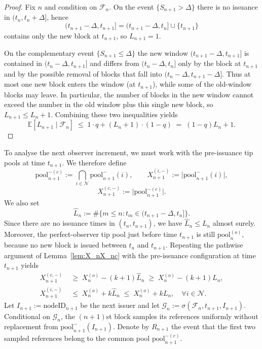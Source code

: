 \documentclass[a4paper,12pt,oneside,reqno]{amsart}
\newcommand{\Nodes}{{\mathcal N}}
\newcommand{\nodeID}{\mathrm{nodeID}}
\newcommand{\E}{{\mathbb E}}
\newcommand{\F}{{\mathcal F}}
\newcommand{\1}{{\mathbf 1}}
\newcommand{\pool}{\mathrm{pool}}
\begin{document}
\begin{proof}
Fix $n$ and condition on $\F_n$. On the event $\{S_{n+1}>\Delta\}$ there is no issuance in $(t_n,t_n+\Delta]$, hence
\[
   (t_{n+1}-\Delta,t_{n+1}] = (t_{n+1}-\Delta,t_n] \cup \{t_{n+1}\}
\]
contains only the new block at $t_{n+1}$, so $L_{n+1}=1$.

On the complementary event $\{S_{n+1}\le\Delta\}$ the new window $(t_{n+1}-\Delta,t_{n+1}]$ is contained in $(t_n-\Delta,t_{n+1}]$ and differs from $(t_n-\Delta,t_n]$ only by the block at $t_{n+1}$ and by the possible removal of blocks that fall into $(t_n-\Delta,t_{n+1}-\Delta]$. Thus at most one new block enters the window (at $t_{n+1}$), while some of the old-window blocks may leave. In particular,
the number of blocks in the new window cannot exceed the number in the old window plus this single new block, so $L_{n+1}\le L_n+1$. Combining these two inequalities yields
\[
   \E[L_{n+1}\mid\F_n]
   \;\le\; 1\cdot q + (L_n+1)\cdot(1-q)
   \;=\; (1-q)L_n + 1.
\]
\end{proof}

To analyse the next observer increment, we must work with the pre-issuance tip pools at time $t_{n+1}$. We therefore define
\[
   \pool_{n+1}^{-(c)} := \bigcap_{i\in\Nodes}\pool_{n+1}^{-}(i),
   \qquad
   X_{n+1}^{(i,-)} := \lvert\pool_{n+1}^{-}(i)\rvert,
\]
\[
   X_{n+1}^{(c,-)} := \lvert\pool_{n+1}^{-(c)}\rvert.
\]
We also set
\[
   \widehat L_n := \#\{m\le n: t_m\in (t_{n+1}-\Delta,t_n]\}.
\]
Since there are no issuance times in $(t_n,t_{n+1})$, we have $\widehat L_n\le L_n$ almost surely. Moreover, the perfect-observer tip pool just before time $t_{n+1}$ is still $\pool_n^{(o)}$, because no new block is issued between $t_n$ and $t_{n+1}$. Repeating the pathwise argument of Lemma~\ref{lem:X_nX_nc} with the pre-issuance configuration at time $t_{n+1}$ yields
\begin{align}
   X_{n+1}^{(c,-)} &\;\ge\; X_n^{(o)}-(k+1)\widehat L_n \;\ge\; X_n^{(o)}-(k+1)L_n,
   \nonumber\\
   X_{n+1}^{(i,-)} &\;\le\; X_n^{(o)}+k\widehat L_n \;\le\; X_n^{(o)}+kL_n,
   \quad \forall i\in\Nodes. \label{eq:XcXi-poisson}
\end{align}
Let $I_{n+1}:=\nodeID_{n+1}$ be the next issuer and let
$\mathcal{G}_n:=\sigma(\F_n,t_{n+1},I_{n+1})$.
Conditional on $\mathcal{G}_n$, the $(n+1)$st block samples its references uniformly without replacement from $\pool_{n+1}^{-}(I_{n+1})$. Denote by $R_{n+1}$ the event that the first two sampled references belong to the common pool $\pool_{n+1}^{-(c)}$.
\end{document}

